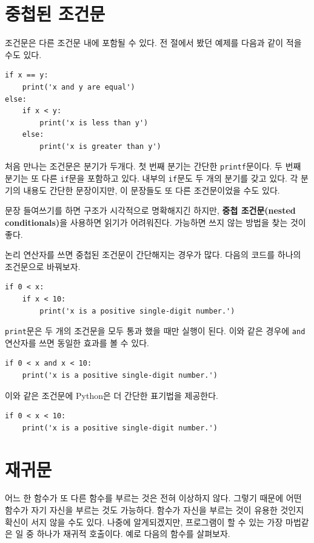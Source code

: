 \documentclass[10pt]{book}
\begin{document}
\section{중첩된 조건문}

조건문은 다른 조건문 내에 포함될 수 있다.  전 절에서 봤던 예제를 다음과
같이 적을 수도 있다.

\begin{verbatim}
if x == y:
    print('x and y are equal')
else:
    if x < y:
        print('x is less than y')
    else:
        print('x is greater than y')
\end{verbatim}
%
처음 만나는 조건문은 분기가 두개다.  첫 번째 분기는 간단한
\texttt{printf}문이다.  두 번째 분기는 또 다른 {\tt if}문을 포함하고
있다.  내부의 {\tt if}문도 두 개의 분기를 갖고 있다.  각 분기의 내용도
간단한 문장이지만, 이 문장들도 또 다른 조건문이었을 수도 있다.

문장 들여쓰기를 하면 구조가 시각적으로 명확해지긴 하지만, {\bf 중첩
  조건문(nested conditionals)}을 사용하면 읽기가 어려워진다.  가능하면
쓰지 않는 방법을 찾는 것이 좋다.

논리 연산자를 쓰면 중첩된 조건문이 간단해지는 경우가 많다.  다음의
코드를 하나의 조건문으로 바꿔보자.


\begin{verbatim}
if 0 < x:
    if x < 10:
        print('x is a positive single-digit number.')
\end{verbatim}
%
{\tt print}문은 두 개의 조건문을 모두 통과 했을 때만 실행이 된다.  이와
같은 경우에 {\tt and} 연산자를 쓰면 동일한 효과를 볼 수 있다.

\begin{verbatim}
if 0 < x and x < 10:
    print('x is a positive single-digit number.')
\end{verbatim}

이와 같은 조건문에 Python은 더 간단한 표기법을 제공한다. 

\begin{verbatim}
if 0 < x < 10:
    print('x is a positive single-digit number.')
\end{verbatim}


\section{재귀문}
\label{recursion}

어느 한 함수가 또 다른 함수를 부르는 것은 전혀 이상하지 않다.  그렇기
때문에 어떤 함수가 자기 자신을 부르는 것도 가능하다.  함수가 자신을
부르는 것이 유용한 것인지 확신이 서지 않을 수도 있다.  나중에
알게되겠지만,  프로그램이 할 수 있는 가장 마법같은 일 중
하나가 재귀적 호출이다. 예로 다음의 함수를 살펴보자.
\end{document}
